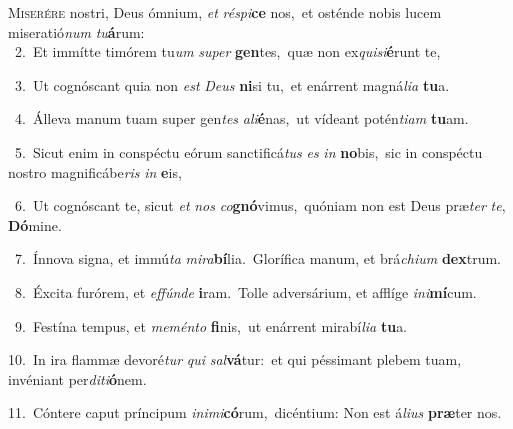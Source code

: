 \lettrine{\initial\textcolor{\initialcolor}{M}}{iserére} nostri, Deus ómnium, \textit{et} \textit{ré}\-\textit{spi}\textbf{ce} nos,~\star et osténde nobis lucem miseratió\textit{num} \textit{tu}\-\textbf{á}rum:\\
{\numbfont\textcolor{\numbcolor}{~2.}}~Et immítte timórem tu\textit{um} \textit{su}\-\textit{per} \textbf{gen}\-tes,~\star quæ non ex\-\textit{qui}\-\textit{si}\textbf{é}runt te,\par
{\numbfont\textcolor{\numbcolor}{~3.}}~Ut cognóscant quia non \textit{est} \textit{De}\-\textit{us} \textbf{ni}\-si tu,~\star et enárrent magná\-\textit{li}\-\textit{a} \textbf{tu}\-a.\par
{\numbfont\textcolor{\numbcolor}{~4.}}~Álleva manum tuam super gen\textit{tes} \textit{a}\-\textit{li}\textbf{é}nas,~\star ut vídeant potén\-\textit{ti}\-\textit{am} \textbf{tu}\-am.\par
{\numbfont\textcolor{\numbcolor}{~5.}}~Sicut enim in conspéctu eórum sanctificá\textit{tus} \textit{es} \textit{in} \textbf{no}\-bis,~\star sic in conspéctu nostro magnificábe\textit{ris} \textit{in} \textbf{e}\-is,\par
{\numbfont\textcolor{\numbcolor}{~6.}}~Ut cognóscant te, sicut \textit{et} \textit{nos} \textit{co}\-\textbf{gnó}vimus,~\star quóniam non est Deus præ\textit{ter} \textit{te}\-, \textbf{Dó}\-mine.\par
{\numbfont\textcolor{\numbcolor}{~7.}}~Ínnova signa, et immú\textit{ta} \textit{mi}\-\textit{ra}\textbf{bí}lia.~\star Glorífica manum, et brá\-\textit{chi}\-\textit{um} \textbf{dex}\-trum.\par
{\numbfont\textcolor{\numbcolor}{~8.}}~Éxcita furórem, et \textit{ef}\-\textit{fún}\textit{de} \textbf{i}\-ram.~\star Tolle adversárium, et afflíge \textit{in}\-\textit{i}\textbf{mí}cum.\par
{\numbfont\textcolor{\numbcolor}{~9.}}~Festína tempus, et \textit{me}\-\textit{mén}\textit{to} \textbf{fi}\-nis,~\star ut enárrent mirabí\-\textit{li}\-\textit{a} \textbf{tu}\-a.\par
{\numbfont\textcolor{\numbcolor}{10.}}~In ira flammæ devoré\textit{tur} \textit{qui} \textit{sal}\-\textbf{vá}tur:~\star et qui péssimant plebem tuam, invéniant per\-\textit{di}\-\textit{ti}\textbf{ó}nem.\par
{\numbfont\textcolor{\numbcolor}{11.}}~Cóntere caput príncipum \textit{in}\-\textit{i}\textit{mi}\textbf{có}rum,~\star dicéntium: Non est á\-\textit{li}\-\textit{us} \textbf{præ}\-ter nos.\par
